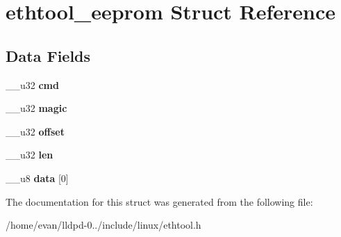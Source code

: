 \section{ethtool\-\_\-eeprom \-Struct \-Reference}
\label{structethtool__eeprom}
\subsection*{\-Data \-Fields}
\begin{DoxyCompactItemize}
\item 
\-\_\-\-\_\-u32 {\bfseries cmd}\label{structethtool__eeprom_a66d231264d5aa36fd7d347e2c967769a}

\item 
\-\_\-\-\_\-u32 {\bfseries magic}\label{structethtool__eeprom_a5b7548b1c76e4bb398e04744ef5c9cbd}

\item 
\-\_\-\-\_\-u32 {\bfseries offset}\label{structethtool__eeprom_a191c1be1c42476d7a5228d5de9da5531}

\item 
\-\_\-\-\_\-u32 {\bfseries len}\label{structethtool__eeprom_a6727c6c5c16cc9c9786bfbfd3f30f9a1}

\item 
\-\_\-\-\_\-u8 {\bfseries data} [0]\label{structethtool__eeprom_a1bfe8b027f6e5624818c1a92b91bf6d2}

\end{DoxyCompactItemize}


\-The documentation for this struct was generated from the following file\-:\begin{DoxyCompactItemize}
\item 
/home/evan/lldpd-\/0../include/linux/ethtool.\-h\end{DoxyCompactItemize}
